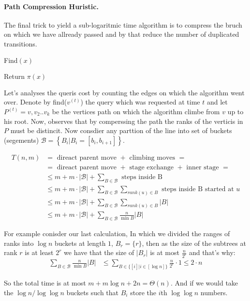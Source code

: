 \paragraph{Path Compression Huristic.} The final trick to yield a sub-logaritmic time algorithm is to compress the bruch on which we have allready passed and by that reduce the number of duplicated transitions.     
\begin{algbox}{Find$(x)$}
  \begin{algorithm}[H]
    Return $\pi\left(x\right)$ 
  \end{algorithm}    
\end{algbox}
Let's analyses the queris cost by counting the edges on which the algorithm went over. Denote by find($v^{(t)}$) the query which was requested at time $t$ and let $P^{(t)}=v,v_{2} .. v_{k}$ be the vertices path on which the algorithm climbe from $v$ up to his root. Now, observes that by comperssing the path the ranks of the verticis in $P$ must be distincit. Now consdier any parttion of the line into set of buckets (segements) $\mathcal{B}= \left\{ B_{i} | B_{i} = [b_{i} ,b_{i+1}] \right\}$. 


\begin{equation*}
  \begin{split}
    T\left( n, m  \right) &= \text{ direact parent move } + \text{ climbing moves  } =    \\
    &=  \text{ direact parent move } + \text{ stage exchange } +  \text{ inner stage } = \\ 
    & \le m + m \cdot | \mathcal{B} | + \sum_{ B \in \mathcal{B} }{ \text{ steps inside B  }   }\\
    & \le m + m \cdot | \mathcal{B} | + \sum_{ B \in \mathcal{B} }{ \sum_{ rank(u) \in B} { \text{ steps inside B started at }u }  }\\
    & \le m + m \cdot | \mathcal{B} | + \sum_{ B \in \mathcal{B} }{ \sum_{ rank(u) \in B}{ |B| }  } \\ 
    & \le m + m \cdot | \mathcal{B} | + \sum_{ B \in \mathcal{B} }{ \frac{n}{\min{B} } |B| }
  \end{split}
\end{equation*}

For example conisder our last calculation, In which we divided the ranges of ranks into $\log n$ buckets at length $1$, $B_{r} = \{r\}$, then as the size of the subtrees at rank $r$ is at least $2^{r}$ we have that the size of $|B_{r}|$ is at most $\frac{n}{2^{r}}$ and that's why:   
\begin{equation*}
  \begin{split}
    \sum_{ B \in \mathcal{B} }{ \frac{n}{\min{B} } |B| } &\le \sum_{ B \in \{ [i] | i \in [ \log n ]  \}  }{ \frac{n}{2^{r}} \cdot 1    } \le  2\cdot n
  \end{split}
\end{equation*}

So the total time is at most $m + m \log n + 2n = \Theta\left( n \right)$. And if we would take the $ \log n  / \log \log n $ buckets such that $B_{i}$ store the  $i$th $\log \log n $ numbers. 




